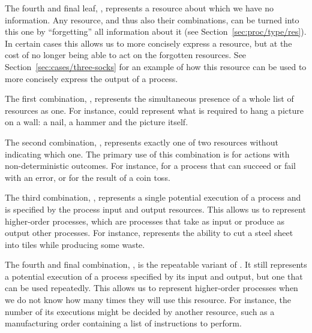 \documentclass[class=smolathesis,crop=false]{standalone}
\begin{document}
The fourth and final leaf, , represents a resource about which we have no information.
Any resource, and thus also their combinations, can be turned into this one by ``forgetting'' all information about it (see Section~\ref{sec:proc/type/res}).
In certain cases this allows us to more concisely express a resource, but at the cost of no longer being able to act on the forgotten resources.
See Section~\ref{sec:cases/three-socks} for an example of how this resource can be used to more concisely express the output of a process.

The first combination, , represents the simultaneous presence of a whole list of resources as one.
For instance,  could represent what is required to hang a picture on a wall: a nail, a hammer and the picture itself.

The second combination, , represents exactly one of two resources without indicating which one.
The primary use of this combination is for actions with non-deterministic outcomes.
For instance,  for a process that can succeed or fail with an error, or  for the result of a coin toss.

The third combination, , represents a single potential execution of a process and is specified by the process input and output resources.
This allows us to represent higher-order processes, which are processes that take as input or produce as output other processes.
For instance,  represents the ability to cut a steel sheet into tiles while producing some waste.

The fourth and final combination, , is the repeatable variant of .
It still represents a potential execution of a process specified by its input and output, but one that can be used repeatedly.
This allows us to represent higher-order processes when we do not know how many times they will use this resource.
For instance, the number of its executions might be decided by another resource, such as a manufacturing order containing a list of instructions to perform.
\end{document}
